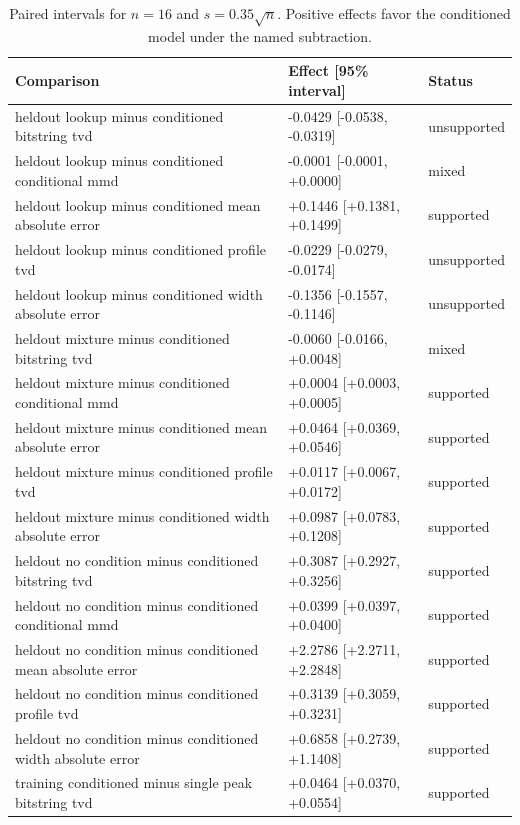 \begin{table}[p]
\centering
\scriptsize
\setlength{\tabcolsep}{4pt}
\caption{Paired intervals for $n=16$ and $s=0.35\sqrt n$. Positive effects favor the conditioned model under the named subtraction.}
\label{tab:all-intervals-n16-w0.35}
\begin{tabular}{@{}p{}p{}p{}@{}}
\toprule
Comparison & Effect [95\% interval] & Status\\
\midrule
heldout lookup minus conditioned bitstring tvd & -0.0429 [-0.0538, -0.0319] & unsupported \\
heldout lookup minus conditioned conditional mmd & -0.0001 [-0.0001, +0.0000] & mixed \\
heldout lookup minus conditioned mean absolute error & +0.1446 [+0.1381, +0.1499] & supported \\
heldout lookup minus conditioned profile tvd & -0.0229 [-0.0279, -0.0174] & unsupported \\
heldout lookup minus conditioned width absolute error & -0.1356 [-0.1557, -0.1146] & unsupported \\
heldout mixture minus conditioned bitstring tvd & -0.0060 [-0.0166, +0.0048] & mixed \\
heldout mixture minus conditioned conditional mmd & +0.0004 [+0.0003, +0.0005] & supported \\
heldout mixture minus conditioned mean absolute error & +0.0464 [+0.0369, +0.0546] & supported \\
heldout mixture minus conditioned profile tvd & +0.0117 [+0.0067, +0.0172] & supported \\
heldout mixture minus conditioned width absolute error & +0.0987 [+0.0783, +0.1208] & supported \\
heldout no condition minus conditioned bitstring tvd & +0.3087 [+0.2927, +0.3256] & supported \\
heldout no condition minus conditioned conditional mmd & +0.0399 [+0.0397, +0.0400] & supported \\
heldout no condition minus conditioned mean absolute error & +2.2786 [+2.2711, +2.2848] & supported \\
heldout no condition minus conditioned profile tvd & +0.3139 [+0.3059, +0.3231] & supported \\
heldout no condition minus conditioned width absolute error & +0.6858 [+0.2739, +1.1408] & supported \\
training conditioned minus single peak bitstring tvd & +0.0464 [+0.0370, +0.0554] & supported \\

\end{tabular}
\end{table}
